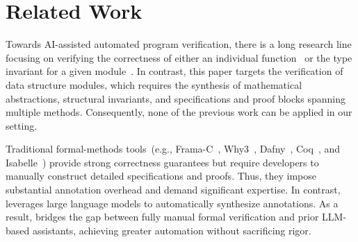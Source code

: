 \section{Related Work}
\label{sec:related}

Towards AI-assisted automated program verification, there is a long research line focusing on verifying the correctness of either an individual function~\cite{cav24llm,autoverus,dafnysinglemethod,loopy,lemur} or the type invariant for a given module~\cite{classinvgen}. In contrast, this paper targets the verification of data structure modules, which requires the synthesis of mathematical abstractions, structural invariants, and specifications and proof blocks spanning multiple methods. Consequently, none of the previous work can be applied in our setting.


Traditional formal-methods tools~(e.g., Frama-C~\cite{framac}, Why3~\cite{why3}, Dafny~\cite{dafny}, Coq~\cite{coq}, and Isabelle~\cite{isabelle}) provide strong correctness guarantees but require developers to manually construct detailed specifications and proofs. Thus, they impose substantial annotation overhead and demand significant expertise. In contrast, \toolname{} leverages large language models to automatically synthesize annotations. As a result, \toolname{} bridges the gap between fully manual formal verification and prior LLM-based assistants, achieving greater automation without sacrificing rigor.





